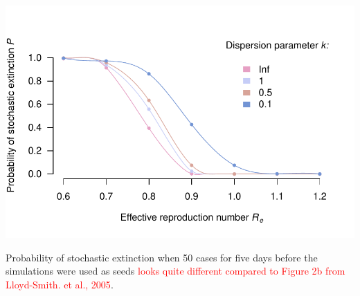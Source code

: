 \documentclass[10pt, a4paper, twoside]{article}
\begin{document}
\clearpage
\begin{suppfigure}[h]
\centering
\includegraphics[scale=0.5]{P_extinction_2021-02-26.pdf}
\caption{Probability of stochastic extinction when 50 cases for five days before the simulations were used as seeds \textcolor{red}{looks quite different compared to Figure 2b from Lloyd-Smith. et al., 2005}. }
\end{suppfigure}
\end{document}
